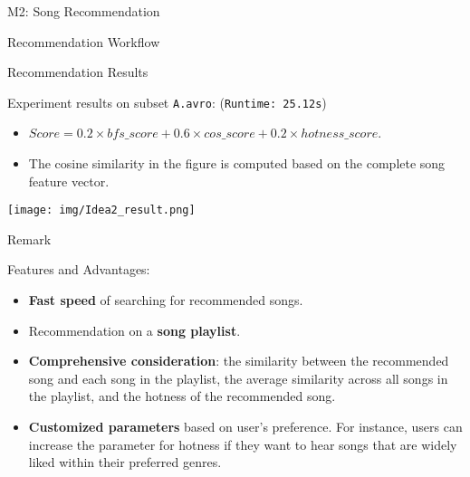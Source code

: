 \documentclass{beamer}
\begin{document}
\begin{section}{M2: Song Recommendation}
\begin{frame}{Recommendation Workflow}

    \end{frame}

    \begin{frame}{Recommendation Results}

    Experiment results on subset \texttt{A.avro}: (\texttt{Runtime: 25.12s})

    \begin{itemize}
        \item $Score = 0.2\times bfs\_score + 0.6 \times cos\_score + 0.2\times hotness\_score$.
        \item The cosine similarity in the figure is computed based on the complete song feature vector.
    \end{itemize}

    \texttt{[image: img/Idea2\_result.png]}
        
    \end{frame}

    \begin{frame}{Remark}

    Features and Advantages:

    \begin{itemize}
        \item \textbf{Fast speed} of searching for recommended songs.
        \item Recommendation on a \textbf{song playlist}.
        \item \textbf{Comprehensive consideration}: the similarity between the recommended song and each song in the playlist, the average similarity across all songs in the playlist, and the hotness of the recommended song.
        \item \textbf{Customized parameters} based on user's preference. For instance, users can increase the parameter for hotness if they want to hear songs that are widely liked within their preferred genres.
    \end{itemize}
        
    \end{frame}
  

\end{section}
\end{document}
